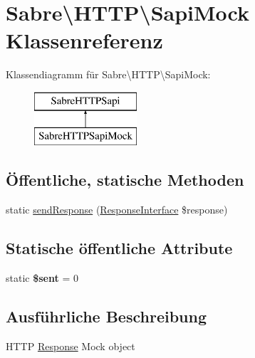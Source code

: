 \hypertarget{class_sabre_1_1_h_t_t_p_1_1_sapi_mock}{}\section{Sabre\textbackslash{}H\+T\+TP\textbackslash{}Sapi\+Mock Klassenreferenz}
\label{class_sabre_1_1_h_t_t_p_1_1_sapi_mock}
Klassendiagramm für Sabre\textbackslash{}H\+T\+TP\textbackslash{}Sapi\+Mock\+:\begin{figure}[H]
\begin{center}
\leavevmode
\includegraphics[height=2.000000cm]{class_sabre_1_1_h_t_t_p_1_1_sapi_mock}
\end{center}
\end{figure}
\subsection*{Öffentliche, statische Methoden}
\begin{DoxyCompactItemize}
\item 
static \mbox{\hyperlink{class_sabre_1_1_h_t_t_p_1_1_sapi_mock_aaaefcf46773df9c4e03f0557ed77b47d}{send\+Response}} (\mbox{\hyperlink{interface_sabre_1_1_h_t_t_p_1_1_response_interface}{Response\+Interface}} \$response)
\end{DoxyCompactItemize}
\subsection*{Statische öffentliche Attribute}
\begin{DoxyCompactItemize}
\item 
\mbox{\label{class_sabre_1_1_h_t_t_p_1_1_sapi_mock_aef82e4d6389fa8cb609fe68cc1130daa}} 
static {\bfseries \$sent} = 0
\end{DoxyCompactItemize}


\subsection{Ausführliche Beschreibung}
H\+T\+TP \mbox{\hyperlink{class_sabre_1_1_h_t_t_p_1_1_response}{Response}} Mock object

